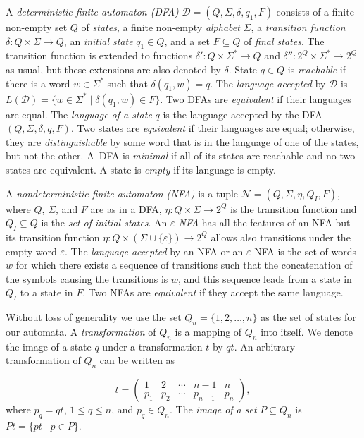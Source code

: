 \documentclass[final]{dmtcs-episciences}
\renewcommand{\le}{\leqslant}
\newcommand{\eps}{\varepsilon}
\newcommand{\Sig}{\Sigma}
\newcommand{\cD}{{\mathcal D}}
\newcommand{\cN}{{\mathcal N}}
\theoremstyle{definition}
\theoremstyle{remark}
\begin{document}
A \emph{deterministic finite automaton (DFA)} $\cD= (Q,\Sig,\delta,q_1,F)$ consists of 
a finite non-empty set $Q$ of \emph{states},
a finite non-empty \emph{alphabet} $\Sig$,  
a \emph{transition function} $\delta\colon Q\times \Sig\to Q$, an
\emph{initial state} $q_1\in Q$, and 
a set $F\subseteq Q$ of \emph{final states}.
The transition function is extended to functions $\delta'\colon Q \times \Sig^*\to Q$ and $\delta''\colon 2^Q \times \Sig^*\to 2^Q$ as usual, but these extensions are  also denoted by $\delta$. 
State $q \in Q$  is \emph{reachable} if there is a word $w\in\Sig^*$ such that $\delta(q_1,w)=q$. 
The \emph{language  accepted} by $\cD$ is $L(\cD)=\{w\in\Sig^* \mid \delta(q_1,w)\in F\}$.
Two DFAs are \emph{equivalent} if their languages are equal.
The \emph{language of a state} $q$ is the language accepted by the DFA 
$(Q,\Sig,\delta,q,F)$.
Two states are \emph{equivalent} if their languages are equal; otherwise, they are \emph{distinguishable} by some word that is in the language of one of the states, but not the other. 
A~DFA is \emph{minimal} if all of its states are reachable and no two states are equivalent.
A state is \emph{empty} if its language is empty.

A \emph{nondeterministic finite automaton (NFA)} is a tuple $\cN= (Q,\Sig,\eta,Q_I,F)$, where 
$Q$, $\Sig$, and $F$ are as in a DFA, $\eta\colon Q\times \Sig\to 2^Q$ is the transition function 
and $Q_I\subseteq Q$ is the \emph{set of initial states}.
An \emph{$\eps$-NFA} has all the features of an NFA but its transition function 
$\eta\colon Q\times (\Sig\cup \{\eps\})\to 2^Q$ allows also transitions under the empty word $\eps$. 
The \emph{language accepted} by an NFA or an $\eps$-NFA is the set of words $w$ for which there exists a sequence of transitions such that the concatenation of the symbols causing the transitions is $w$,
and this sequence leads from a state in $Q_I$ to a state in $F$.
Two NFAs are \emph{equivalent} if they accept the same language.

Without loss of generality we use the set $Q_n=\{1,2,\dots,n\}$ as the set of states for our automata.
A \emph{transformation} of $Q_n$ is a mapping of $Q_n$ into itself.
We denote the image of a state $q$ under a transformation $t$ by $qt$.
An arbitrary transformation of $Q_n$ can be written as
\goodbreak

\begin{equation*}\label{eq:transmatrix}
t=\left( \begin{array}{ccccc}
1 & 2 &   \cdots &  n-1 & n \\
p_1 & p_2 &   \cdots &  p_{n-1} & p_n
\end{array} \right ),
\end{equation*}
where $p_q = qt$,  $1\le q\le n$, and $p_q\in Q_n$.
The \emph{image of a set} $P\subseteq Q_n$ 
is $Pt=\{ pt \mid p\in P \}$.
\end{document}
